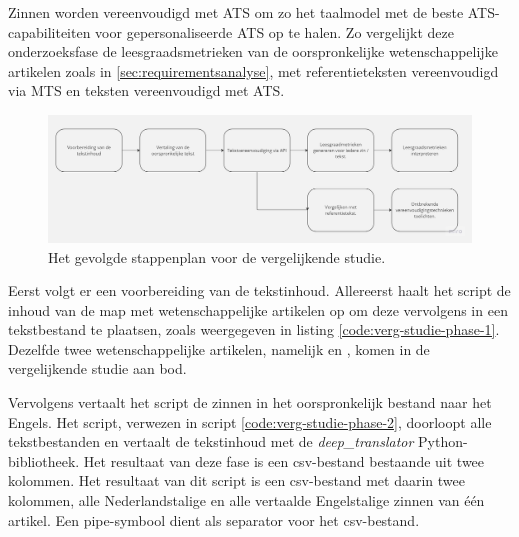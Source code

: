 Zinnen worden vereenvoudigd met ATS om zo het taalmodel met de beste ATS-capabiliteiten voor gepersonaliseerde ATS op te halen.
Zo vergelijkt deze onderzoeksfase de leesgraadsmetrieken van de oorspronkelijke wetenschappelijke artikelen zoals in \ref{sec:requirementsanalyse}, met referentieteksten vereenvoudigd via MTS en teksten vereenvoudigd met ATS. 

\begin{figure}
\includegraphics[width=\linewidth]{img/flowchart-vergelijkende-studie.jpg}
\caption{Het gevolgde stappenplan voor de vergelijkende studie.}
\label{img:flowchart-vergelijkende-studie-metrics}
\end{figure}

\medspace

Eerst volgt er een voorbereiding van de tekstinhoud. Allereerst haalt het script de inhoud van de map met wetenschappelijke artikelen op om deze vervolgens in een tekstbestand te plaatsen, zoals weergegeven in listing \ref{code:verg-studie-phase-1}. Dezelfde twee wetenschappelijke artikelen, namelijk \textcite{Sleuwaegen2022} en \textcite{VanBrakel2022}, komen in de vergelijkende studie aan bod.

\medspace

Vervolgens vertaalt het script de zinnen in het oorspronkelijk bestand naar het Engels. Het script, verwezen in script \ref{code:verg-studie-phase-2}, doorloopt alle tekstbestanden en vertaalt de tekstinhoud met de \textit{deep\_translator} Python-bibliotheek. Het resultaat van deze fase is een csv-bestand bestaande uit twee kolommen. Het resultaat van dit script is een csv-bestand met daarin twee kolommen, alle Nederlandstalige en alle vertaalde Engelstalige zinnen van één artikel. Een pipe-symbool dient als separator voor het csv-bestand.

\medspace

